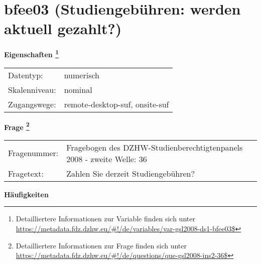 
    \setcounter{footnote}{0}

    \vspace*{-1.8cm}
	\section{bfee03 (Studiengebühren: werden aktuell gezahlt?)}
	\label{section:bfee03}



    \vspace*{0.5cm}
    \noindent\textbf{Eigenschaften
	\footnote{Detailliertere Informationen zur Variable finden sich unter
		\url{https://metadata.fdz.dzhw.eu/\#!/de/variables/var-gsl2008-ds1-bfee03$}}}\\
	\begin{tabularx}{\hsize}{@{}lX}
	Datentyp: & numerisch \\
	Skalenniveau: & nominal \\
	Zugangswege: &
	  remote-desktop-suf, 
	  onsite-suf
 \\
    \end{tabularx}



				\vspace*{0.5cm}
                \noindent\textbf{Frage
	                \footnote{Detailliertere Informationen zur Frage finden sich unter
		              \url{https://metadata.fdz.dzhw.eu/\#!/de/questions/que-gsl2008-ins2-36$}}}\\
				\begin{tabularx}{\hsize}{@{}lX}
					Fragenummer: &
					  Fragebogen des DZHW-Studienberechtigtenpanels 2008 - zweite Welle:
					  36
 \\
					Fragetext: & Zahlen Sie derzeit Studiengebühren? \\
				\end{tabularx}





        		\vspace*{0.5cm}
                \noindent\textbf{Häufigkeiten}

